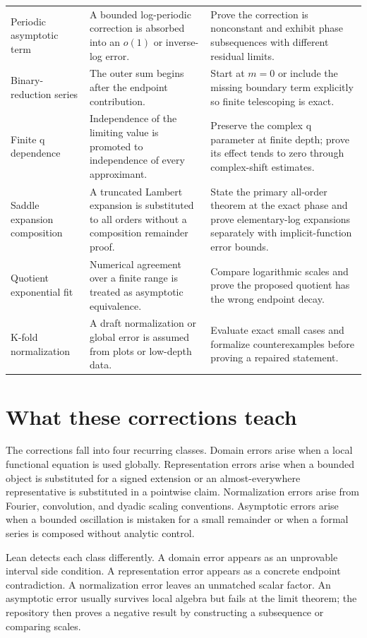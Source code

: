 \documentclass[11pt,oneside]{report}
\theoremstyle{definition}
\theoremstyle{remark}
\begin{document}
\begin{longtable}{>{\raggedright\arraybackslash}p{} >{\raggedright\arraybackslash}p{} >{\raggedright\arraybackslash}p{}}
Periodic asymptotic term & A bounded log-periodic correction is absorbed into an \(o(1)\) or inverse-log error. & Prove the correction is nonconstant and exhibit phase subsequences with different residual limits. \\
Binary-reduction series & The outer sum begins after the endpoint contribution. & Start at \(m=0\) or include the missing boundary term explicitly so finite telescoping is exact. \\
Finite q dependence & Independence of the limiting value is promoted to independence of every approximant. & Preserve the complex q parameter at finite depth; prove its effect tends to zero through complex-shift estimates. \\
Saddle expansion composition & A truncated Lambert expansion is substituted to all orders without a composition remainder proof. & State the primary all-order theorem at the exact phase and prove elementary-log expansions separately with implicit-function error bounds. \\
Quotient exponential fit & Numerical agreement over a finite range is treated as asymptotic equivalence. & Compare logarithmic scales and prove the proposed quotient has the wrong endpoint decay. \\
K-fold normalization & A draft normalization or global error is assumed from plots or low-depth data. & Evaluate exact small cases and formalize counterexamples before proving a repaired statement. \\
\bottomrule
\end{longtable}

\section{What these corrections teach}
The corrections fall into four recurring classes.  Domain errors arise when a local functional equation is used globally.  Representation errors arise when a bounded object is substituted for a signed extension or an almost-everywhere representative is substituted in a pointwise claim.  Normalization errors arise from Fourier, convolution, and dyadic scaling conventions.  Asymptotic errors arise when a bounded oscillation is mistaken for a small remainder or when a formal series is composed without analytic control.

Lean detects each class differently.  A domain error appears as an unprovable interval side condition.  A representation error appears as a concrete endpoint contradiction.  A normalization error leaves an unmatched scalar factor.  An asymptotic error usually survives local algebra but fails at the limit theorem; the repository then proves a negative result by constructing a subsequence or comparing scales.
\end{document}
